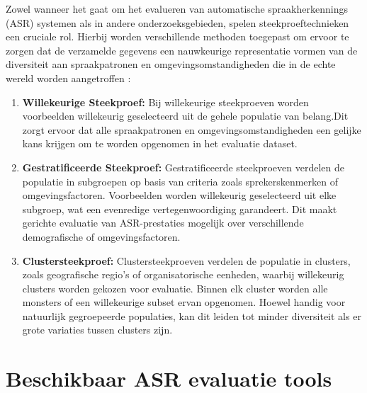 Zowel wanneer het gaat om het evalueren van automatische spraakherkennings (ASR) systemen als in andere onderzoeksgebieden, spelen steekproeftechnieken een cruciale rol. Hierbij worden verschillende methoden toegepast om ervoor te zorgen dat de verzamelde gegevens een nauwkeurige representatie vormen van de diversiteit aan spraakpatronen en omgevingsomstandigheden die in de echte wereld worden aangetroffen \autocite{huggingface2023asr}:
\begin{enumerate}[label=\arabic*.]
 
    \item \textbf{Willekeurige Steekproef:}
        Bij willekeurige steekproeven worden voorbeelden willekeurig geselecteerd uit de gehele populatie van belang.Dit zorgt ervoor dat alle spraakpatronen en omgevingsomstandigheden een gelijke kans krijgen om te worden opgenomen in het evaluatie dataset.
        
    \item \textbf{Gestratificeerde Steekproef:}
        Gestratificeerde steekproeven verdelen de populatie in subgroepen op basis van criteria zoals sprekerskenmerken of omgevingsfactoren. Voorbeelden worden willekeurig geselecteerd uit elke subgroep, wat een evenredige vertegenwoordiging garandeert. Dit maakt gerichte evaluatie van ASR-prestaties mogelijk over verschillende demografische of omgevingsfactoren.
        
    \item \textbf{Clustersteekproef:}
        Clustersteekproeven verdelen de populatie in clusters, zoals geografische regio's of organisatorische eenheden, waarbij willekeurig clusters worden gekozen voor evaluatie. Binnen elk cluster worden alle monsters of een willekeurige subset ervan opgenomen. Hoewel handig voor natuurlijk gegroepeerde populaties, kan dit leiden tot minder diversiteit als er grote variaties tussen clusters zijn.
         
\end{enumerate}



\section{Beschikbaar ASR evaluatie tools}
